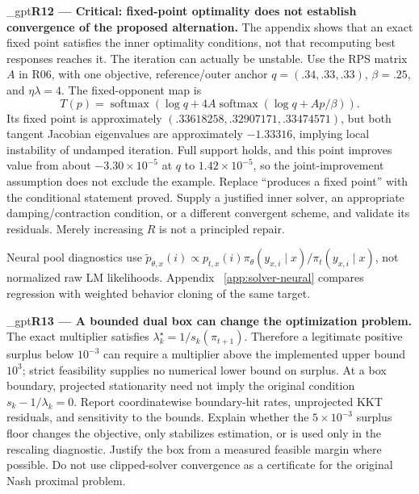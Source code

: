 \documentclass{article}
\makeatletter
\newif\ifshowreviews
\let\revieworiginalref\ref
\newcommand{\reviewref}[1]{%
  \@ifundefined{r@#1}{\textnormal{[original-draft ref.: \texttt{\detokenize{#1}}]}}%
  {\revieworiginalref{#1}}}
\let\ref\reviewref
\newcommand{\reviewresponse}[1]{%
  \ifshowreviews
  \par\begingroup\color{blue!65!black}\hypersetup{allcolors=blue!65!black}\emergencystretch=2em%
  \noindent\textbf{Response:} #1\par\endgroup
  \fi}
\theoremstyle{remark}
\theoremstyle{plain}
\makeatother
\begin{document}
\kekim_gpt{\textbf{R12 --- Critical: fixed-point optimality does not establish convergence of the proposed alternation.} The appendix shows that an exact fixed point satisfies the inner optimality conditions, not that recomputing best responses reaches it. The iteration can actually be unstable. Use the RPS matrix $A$ in R06, with one objective, reference/outer anchor $q=(.34,.33,.33)$, $\beta=.25$, and $\eta\lambda=4$. The fixed-opponent map is
\[
T(p)=\operatorname{softmax}\!\left(\log q+4A\operatorname{softmax}(\log q+Ap/\beta)\right).
\]
Its fixed point is approximately $(.33618258,.32907171,.33474571)$, but both tangent Jacobian eigenvalues are approximately $-1.33316$, implying local instability of undamped iteration. Full support holds, and this point improves value from about $-3.30\times10^{-5}$ at $q$ to $1.42\times10^{-5}$, so the joint-improvement assumption does not exclude the example. Replace ``produces a fixed point'' with the conditional statement proved. Supply a justified inner solver, an appropriate damping/contraction condition, or a different convergent scheme, and validate its residuals. Merely increasing $R$ is not a principled repair.}
\reviewresponse{\textbf{R12 --- Addressed in the algorithmic claim.} Unconditional convergence of best-response alternation is replaced by direct optimization of the strictly concave finite-pool objective. Appendix~\ref{app:direct-stability} retains the unstable fixed-point example, tangent eigenvalues near $-1.333163$, derivatives and numerical-residual conditions. These establish the appropriate finite-pool formulation, not convergence of a neural approximation.}

Neural pool diagnostics use $\widetilde p_{\theta,x}(i)\propto p_{t,x}(i)\pi_\theta(y_{x,i}\mid x)/\pi_t(y_{x,i}\mid x)$, not normalized raw LM likelihoods. Appendix~\ref{app:solver-neural} compares regression with weighted behavior cloning of the same target.


\kekim_gpt{\textbf{R13 --- A bounded dual box can change the optimization problem.} The exact multiplier satisfies $\lambda_k^\star=1/s_k(\pi_{t+1})$. Therefore a legitimate positive surplus below $10^{-3}$ can require a multiplier above the implemented upper bound $10^3$; strict feasibility supplies no numerical lower bound on surplus. At a box boundary, projected stationarity need not imply the original condition $s_k-1/\lambda_k=0$. Report coordinatewise boundary-hit rates, unprojected KKT residuals, and sensitivity to the bounds. Explain whether the $5\times10^{-3}$ surplus floor changes the objective, only stabilizes estimation, or is used only in the rescaling diagnostic. Justify the box from a measured feasible margin where possible. Do not use clipped-solver convergence as a certificate for the original Nash proximal problem.}
\reviewresponse{\textbf{R13 --- Partially addressed.} The manuscript separates box-projected stationarity from the original KKT condition. UF-4 reports inactive bounds, multipliers $7.30$--$11.04$, dual residual $3.74\times10^{-14}$ and maximum inner stationarity spread $1.88\times10^{-10}$. This single interior solve does not replace bound-sensitivity or boundary-hit sweeps; the historical surplus floor still requires implementation reconciliation.}
\end{document}
